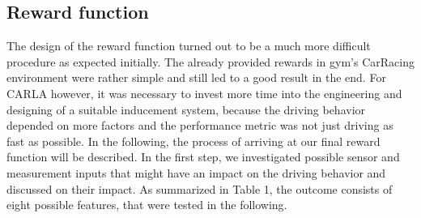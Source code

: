 \documentclass[letterpaper, 10 pt, conference]{ieeeconf}  %
\begin{document}
\subsection{Reward function}
The design of the reward function turned out to be a much more difficult procedure as expected initially. The already provided rewards in gym's CarRacing environment were rather simple and still led to a good result in the end. For CARLA however, it was necessary to invest more time into the engineering and designing of a suitable inducement system, because the driving behavior depended on more factors and the performance metric was not just driving as fast as possible. In the following, the process of arriving at our final reward function will be described. \newline 
In the first step, we investigated possible sensor and measurement inputs that might have an impact on the driving behavior and discussed on their impact. As summarized in Table 1, the outcome consists of eight possible features, that were tested in the following.
\end{document}
